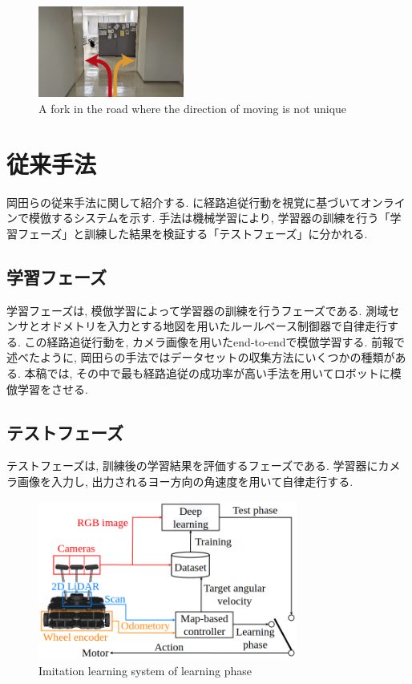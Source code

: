 \documentclass{jarticle}
\begin{document}
\vspace{3mm}

\begin{figure}[h]
 \centering
  \includegraphics[height=30mm]{road.png}
  \vspace*{-4mm}
  \caption{A fork in the road where the direction of moving is not unique}
  \label{fig: fig1}
\end{figure}

\section{従来手法}
岡田らの従来手法に関して紹介する. に経路追従行動を視覚に基づいてオンラインで模倣するシステムを示す. 手法は機械学習により, 学習器の訓練を行う「学習フェーズ」と訓練した結果を検証する「テストフェーズ」に分かれる.

\subsection{学習フェーズ}
学習フェーズは, 模倣学習によって学習器の訓練を行うフェーズである. 測域センサとオドメトリを入力とする地図を用いたルールベース制御器で自律走行する. この経路追従行動を, カメラ画像を用いたend-to-endで模倣学習する. 前報\cite{okada2}で述べたように, 岡田らの手法ではデータセットの収集方法にいくつかの種類がある. 本稿では, その中で最も経路追従の成功率が高い手法を用いてロボットに模倣学習をさせる.

\subsection{テストフェーズ}
テストフェーズは, 訓練後の学習結果を評価するフェーズである. 学習器にカメラ画像を入力し, 出力されるヨー方向の角速度を用いて自律走行する.

\begin{figure}[h]
  \centering
   \includegraphics[width=85mm]{system.png}
   \vspace*{-4mm}
   \caption{Imitation learning system of learning phase}
   \label{fig: fig2}
 \end{figure}
\end{document}
